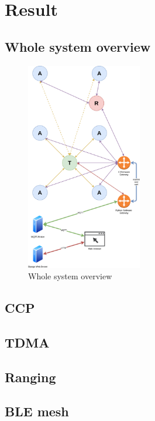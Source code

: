 \documentclass[\main/main.tex]{subfiles}
\begin{document}
\graphicspath{{img/}{06_result/img/}}

\chapter{Result}

\section{Whole system overview}
\begin{figure}[H]
    \centering
    \includegraphics[width=0.45\textwidth]{system_overview.png}
    \caption{Whole system overview}
    \label{fig:system_overview}
\end{figure}

\section{CCP}

\section{TDMA}

\section{Ranging}

\section{BLE mesh}
\end{document}
